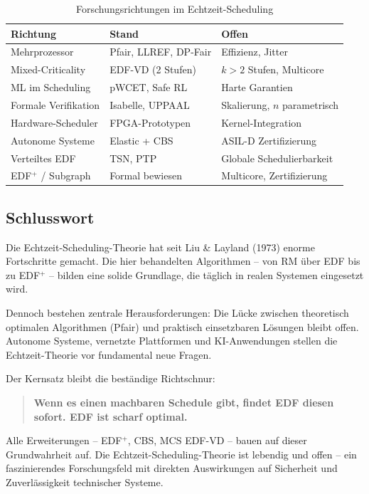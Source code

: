 ﻿\documentclass[a4paper,12pt]{report}
\theoremstyle{definition}
\begin{document}
\begin{table}[H]
	\centering
	\caption{Forschungsrichtungen im Echtzeit-Scheduling}
	\begin{tabular}{p{3.8cm}p{3.8cm}p{3.8cm}}
		\toprule
		\textbf{Richtung} & \textbf{Stand} & \textbf{Offen} \\
		\midrule
		Mehrprozessor & Pfair, LLREF, DP-Fair & Effizienz, Jitter \\
		Mixed-Criticality & EDF-VD (2 Stufen) & $k > 2$ Stufen, Multicore \\
		ML im Scheduling & pWCET, Safe RL & Harte Garantien \\
		Formale Verifikation & Isabelle, UPPAAL & Skalierung, $n$ parametrisch \\
		Hardware-Scheduler & FPGA-Prototypen & Kernel-Integration \\
		Autonome Systeme & Elastic + CBS & ASIL-D Zertifizierung \\
		Verteiltes EDF & TSN, PTP & Globale Schedulierbarkeit \\
		EDF$^+$ / Subgraph & Formal bewiesen & Multicore, Zertifizierung \\
		\bottomrule
	\end{tabular}
\end{table}

\subsection{Schlusswort}

Die Echtzeit-Scheduling-Theorie hat seit Liu \& Layland (1973) enorme
Fortschritte gemacht. Die hier behandelten Algorithmen -- von RM über EDF
bis zu EDF$^+$ -- bilden eine solide Grundlage, die täglich in realen
Systemen eingesetzt wird.

Dennoch bestehen zentrale Herausforderungen: Die Lücke zwischen theoretisch
optimalen Algorithmen (Pfair) und praktisch einsetzbaren Lösungen bleibt
offen. Autonome Systeme, vernetzte Plattformen und KI-Anwendungen stellen
die Echtzeit-Theorie vor fundamental neue Fragen.

Der Kernsatz bleibt die beständige Richtschnur:

\begin{quote}
\textbf{Wenn es einen machbaren Schedule gibt, findet EDF diesen sofort.
EDF ist scharf optimal.}
\end{quote}

Alle Erweiterungen -- EDF$^+$, CBS, MCS EDF-VD -- bauen auf dieser Grundwahrheit
auf. Die Echtzeit-Scheduling-Theorie ist lebendig und offen -- ein faszinierendes
Forschungsfeld mit direkten Auswirkungen auf Sicherheit und Zuverlässigkeit
technischer Systeme.
\end{document}
